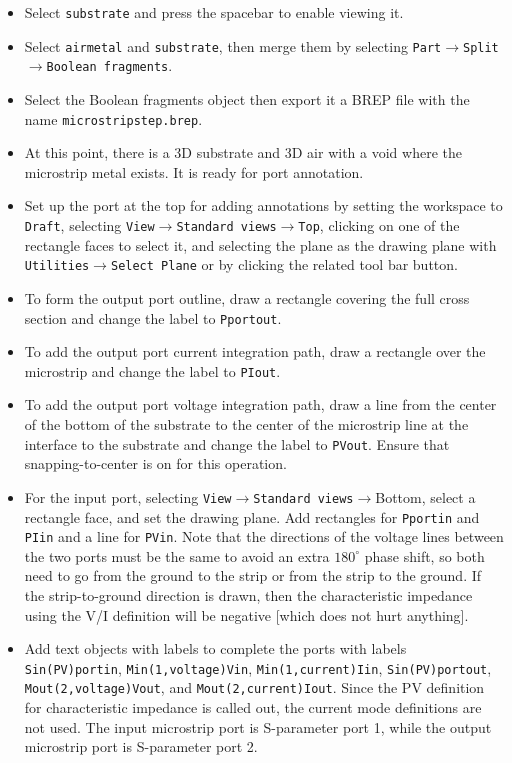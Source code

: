 \documentclass[titlepage]{article}
\renewcommand\_{\textunderscore\linebreak[1]}
\begin{document}
\begin{itemize}
\item Select \texttt{substrate} and press the spacebar to enable viewing it.
\item Select \texttt{air\_metal} and \texttt{substrate}, then merge them by selecting \texttt{Part}$\rightarrow$\texttt{Split}$\rightarrow$\texttt{Boolean fragments}. 
\item Select the Boolean fragments object then export it a BREP file with the name \texttt{microstrip\_step.brep}.
\item At this point, there is a 3D substrate and 3D air with a void where the microstrip metal exists.  It is ready for port annotation.
\item Set up the port at the top for adding annotations by setting the workspace to \texttt{Draft}, selecting \texttt{View}$\rightarrow$\texttt{Standard views}$\rightarrow$\texttt{Top}, clicking on one of the rectangle faces to select it, and selecting the plane as the drawing plane with \texttt{Utilities}$\rightarrow$\texttt{Select Plane} or by clicking the related tool bar button.
\item To form the output port outline, draw a rectangle covering the full cross section and change the label to \texttt{\_Pportout}.
\item To add the output port current integration path, draw a rectangle over the microstrip and change the label to \texttt{\_PIout}.
\item To add the output port voltage integration path, draw a line from the center of the bottom of the substrate to the center of the microstrip line at the interface to the substrate and change the label to \texttt{\_PVout}.  Ensure that snapping-to-center is on for this operation.
\item For the input port, selecting \texttt{View}$\rightarrow$\texttt{Standard views}$\rightarrow${Bottom}, select a rectangle face, and set the drawing plane.  Add rectangles for \texttt{\_Pportin} and \texttt{\_PIin} and a line for \texttt{\_PVin}.  Note that the directions of the voltage lines between the two ports must be the same to avoid an extra $180^\circ$ phase shift, so both need to go from the ground to the strip or from the strip to the ground.  If the strip-to-ground direction is drawn, then the characteristic impedance using the V/I definition will be negative [which does not hurt anything].
\item Add text objects with labels to complete the ports with labels \texttt{\_Sin(PV){portin}}, \texttt{\_Min(1,voltage){Vin}}, \texttt{\_Min(1,current){Iin}}, \texttt{\_Sin(PV){portout}}, \texttt{\_Mout(2,voltage){Vout}}, and \texttt{\_Mout(2,current){Iout}}.  Since the PV definition for characteristic impedance is called out, the current mode definitions are not used.  The input microstrip port is S-parameter port 1, while the output microstrip port is S-parameter port 2.

\end{itemize}
\end{document}

